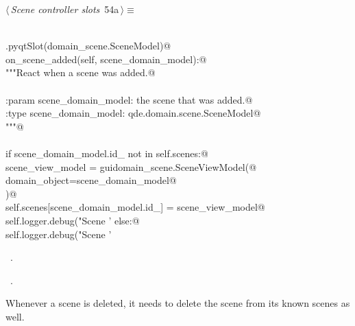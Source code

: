 \documentclass[
    a4paper,      %
    10pt,         %
    openright,    %
    notitlepage,  %
    parskip=half, %
]{scrreprt}       %
\theoremstyle{definition}                    %
\begin{document}
\begin{flushleft} \small
\begin{minipage}{\linewidth}\label{scrap84}\raggedright\small
{} $\langle\,${\itshape Scene controller slots}\nobreak\ {\footnotesize {54a}}$\,\rangle\equiv$
\vspace{-1exm}
\begin{list}{}{} \item
\mbox{}\lstinline@@\\
\mbox{}\lstinline@QtCore.pyqtSlot(domain_scene.SceneModel)@\\
\mbox{}\lstinline@def on_scene_added(self, scene_domain_model):@\\
\mbox{}\lstinline@    """React when a scene was added.@\\
\mbox{}\lstinline@@\\
\mbox{}\lstinline@    :param scene_domain_model: the scene that was added.@\\
\mbox{}\lstinline@    :type scene_domain_model:  qde.domain.scene.SceneModel@\\
\mbox{}\lstinline@    """@\\
\mbox{}\lstinline@@\\
\mbox{}\lstinline@    if scene_domain_model.id_ not in self.scenes:@\\
\mbox{}\lstinline@        scene_view_model = guidomain_scene.SceneViewModel(@\\
\mbox{}\lstinline@            domain_object=scene_domain_model@\\
\mbox{}\lstinline@        )@\\
\mbox{}\lstinline@        self.scenes[scene_domain_model.id_] = scene_view_model@\\
\mbox{}\lstinline@        self.logger.debug("Scene '%s' was added" % scene_view_model)@\\
\mbox{}\lstinline@    else:@\\
\mbox{}\lstinline@        self.logger.debug("Scene '%s' already known" % scene)@\\
\mbox{}\lstinline@@{\NWsep}
\end{list}
\vspace{-1.5ex}
\footnotesize
\begin{list}{}{\setlength{\itemsep}{-\parsep}\setlength{\itemindent}{-\leftmargin}}
\item \NWtxtMacroDefBy\ .
\item \NWtxtMacroRefIn\ .

\item{}
\end{list}
\end{minipage}\vspace{4ex}
\end{flushleft}
Whenever a scene is deleted, it needs to delete the scene from its known scenes
as well.
\end{document}
